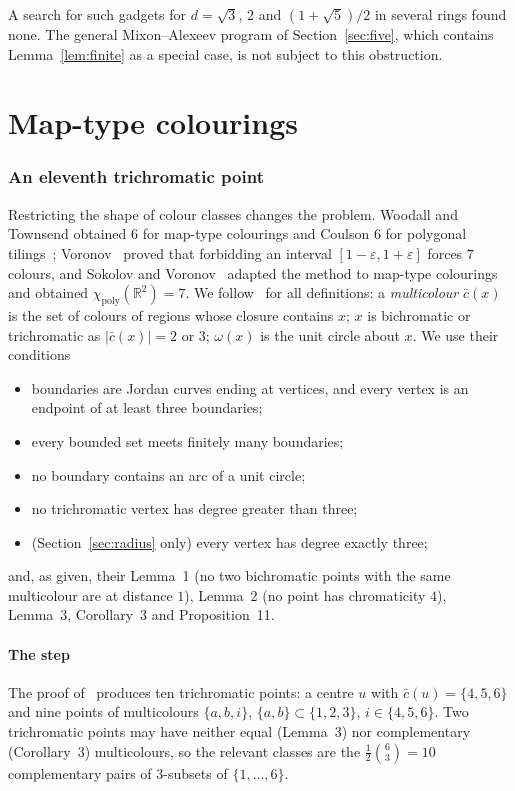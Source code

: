 \documentclass[11pt,a4paper]{amsart}
\theoremstyle{remark}
\newcommand{\R}{\mathbb{R}}
\begin{document}
A search for such gadgets for $d=\sqrt3$, $2$ and $(1+\sqrt5)/2$ in several rings found none. The general Mixon--Alexeev program of Section~\ref{sec:five}, which contains Lemma~\ref{lem:finite} as a special case, is not subject to this obstruction.



\part{Map-type colourings}

\section{An eleventh trichromatic point}\label{sec:map}

Restricting the shape of colour classes changes the problem. Woodall and Townsend obtained $6$ for map-type colourings and Coulson $6$ for polygonal tilings~\cite{Co04}; Voronov~\cite{Vo24} proved that forbidding an interval $[1-\varepsilon,1+\varepsilon]$ forces $7$ colours, and Sokolov and Voronov~\cite{SV26} adapted the method to map-type colourings and obtained $\chi_{\mathrm{poly}}(\R^2)=7$. We follow~\cite{SV26} for all definitions: a \emph{multicolour} $\bar c(x)$ is the set of colours of regions whose closure contains $x$; $x$ is bichromatic or trichromatic as $|\bar c(x)|=2$ or $3$; $\omega(x)$ is the unit circle about $x$. We use their conditions
\begin{itemize}
\item[C2] boundaries are Jordan curves ending at vertices, and every vertex is an endpoint of at least three boundaries;
\item[C3] every bounded set meets finitely many boundaries;
\item[C5] no boundary contains an arc of a unit circle;
\item[C6] no trichromatic vertex has degree greater than three;
\item[C7] (Section~\ref{sec:radius} only) every vertex has degree exactly three;
\end{itemize}
and, as given, their Lemma~1 (no two bichromatic points with the same multicolour are at distance $1$), Lemma~2 (no point has chromaticity $4$), Lemma~3, Corollary~3 and Proposition~11.

\subsection{The step}
The proof of~\cite[Lemma 4]{SV26} produces ten trichromatic points: a centre $u$ with $\bar c(u)=\{4,5,6\}$ and nine points of multicolours $\{a,b,i\}$, $\{a,b\}\subset\{1,2,3\}$, $i\in\{4,5,6\}$. Two trichromatic points may have neither equal (Lemma~3) nor complementary (Corollary~3) multicolours, so the relevant classes are the $\tfrac12\binom63=10$ complementary pairs of $3$-subsets of $\{1,\dots,6\}$.
\end{document}
